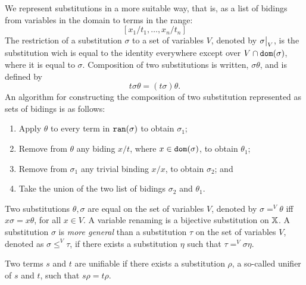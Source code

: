 We represent substitutions in a more suitable way, that is, as a list of bidings from variables in the domain to terms in the range:
$$[x_1 / t_1, \dots, x_n / t_n ]$$
The restriction of a substitution $\sigma$ to a set of variables $V$, denoted by $\restr{\sigma}{V}$, is the substitution wich is equal to the identity everywhere except over $V \cap \mathtt{dom}(\sigma)$, where it is equal to $\sigma$. Composition of two substitutions is written, $\sigma \theta$, and is defined by
$$t\sigma \theta = (t\sigma)\theta.$$
An algorithm for constructing the composition of two substitution represented as sets of bidings is as follows:
\begin{enumerate}
    \item Apply $\theta$ to every term in $\mathtt{ran}(\sigma)$ to obtain $\sigma_1$;
    \item Remove from $\theta$ any biding $x/t$, where $x \in \mathtt{dom}(\sigma)$, to obtain $\theta_1$;
    \item Remove from $\sigma_1$ any trivial binding $x/x$, to obtain $\sigma_2$; and
    \item Take the union of the two list of bidings $\sigma_2$ and $\theta_1$.
\end{enumerate}
Two substitutions $\theta, \sigma$ are equal on the set of variables $V$, denoted by $\sigma =^V \theta$ iff $x \sigma = x \theta$, for all $x \in V$. A variable renaming is a bijective substitution on $\mathbb{X}$. A substitution $\sigma$ is \textit{more general} than a substitution $\tau$ on the set of variables $V$, denoted as $\sigma \leq^V \tau$, if there exists a substitution $\eta$ such that $ \tau =^V \sigma \eta$.

Two terms $s$ and $t$ are unifiable if there exists a substitution $\rho$, a so-called unifier of $s$ and $t$, such that $s \rho = t \rho$.
